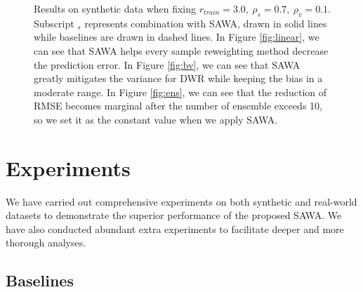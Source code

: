 \begin{figure*}[t]
	\centering
	\caption{Results on synthetic data when fixing $r_{train}=3.0,\ \rho_s=0.7,\ \rho_v=0.1$. 
    Subscript $_s$ represents combination with SAWA, drawn in solid lines while baselines are drawn in dashed lines. 
    In Figure \ref{fig:linear}, we can see that SAWA helps every sample reweighting method decrease the prediction error. 
    In Figure \ref{fig:bv}, we can see that SAWA greatly mitigates the variance for DWR while keeping the bias in a moderate range. 
    In Figure \ref{fig:ens}, we can see that the reduction of RMSE becomes marginal after the number of ensemble exceeds 10, so we set it as the constant value when we apply SAWA. 
    }
	\label{fig:basic}
\end{figure*}


\section{Experiments}
\label{sec:exp}

We have carried out comprehensive experiments on both synthetic and real-world datasets to demonstrate the superior performance of the proposed SAWA. We have also conducted abundant extra experiments to facilitate deeper and more thorough analyses. 

\subsection{Baselines}

